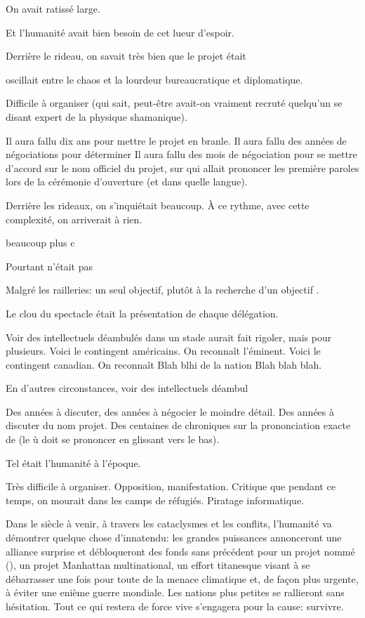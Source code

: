 On avait ratissé large.


Et l'humanité avait bien besoin de cet lueur d'espoir.

Derrière le rideau, on savait très bien que le projet \nomProjet{} était 

oscillait entre le chaos et la lourdeur bureaucratique et diplomatique.

Difficile à organiser (qui sait, peut-être avait-on vraiment recruté quelqu'un se disant expert de la physique shamanique).

Il aura fallu dix ans pour mettre le projet en branle.
Il aura fallu des années de négociations pour déterminer
Il aura fallu des mois de négociation pour se mettre d'accord sur le nom officiel du projet, sur qui allait prononcer les première paroles
lors de la cérémonie d'ouverture (et dans quelle langue).

Derrière les rideaux, on s'inquiétait beaucoup.
À ce rythme, avec cette complexité, on arriverait à rien.

beaucoup plus c

Pourtant \nomProjet{} n'était pas 



Malgré les railleries: un seul objectif, plutôt \og à la recherche d'un objectif \fg.





Le clou du spectacle était la présentation de chaque délégation.



Voir des intellectuels déambulés dans un stade aurait fait rigoler, mais pour
plusieurs. Voici le contingent américains. On reconnaît l'éminent.
Voici le contingent canadian. 
On reconnaît Blah blhi de la nation Blah blah blah.

En d'autres circonstances, 
voir des intellectuels déambul

Des années à discuter, des années à négocier le moindre détail. 
Des années à discuter du nom projet. Des centaines de chroniques
sur la prononciation exacte de \nomProjet{} (le \og ù \fg doit se prononcer en glissant vers le bas).

Tel était l'humanité à l'époque.

Très difficile à organiser.  Opposition, manifestation. Critique que pendant ce
temps, on mourait dans les camps de réfugiés.
Piratage informatique.


Dans le siècle à venir, à travers les cataclysmes et les conflits, l'humanité
va démontrer quelque chose d'innatendu: les grandes puissances annonceront une
alliance surprise et débloqueront des fonds sans précédent pour un projet nommé
\textit{\nomProjet{}} (\nomProjetEn{}), un projet Manhattan multinational, un
effort titanesque visant à se débarrasser une fois pour toute de la menace
climatique et, de façon plus urgente, à éviter une enième guerre mondiale.  Les
nations plus petites se rallieront sans hésitation.  Tout ce qui restera de
force vive s'engagera pour la cause: survivre.

